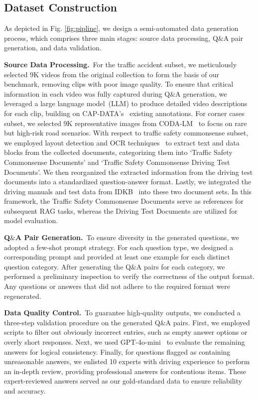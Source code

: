 \documentclass[sigconf]{acmart}
\begin{document}
\subsection{Dataset Construction}

As depicted in Fig. \ref{fig:pipline}, we design a semi-automated data generation process, which comprises three main stages: source data processing, Q$\&$A pair generation, and data validation.

\noindent\textbf{Source Data Processing.}~For the traffic accident subset, we meticulously selected 9K videos from the original collection to form the basis of our benchmark, removing clips with poor image quality. To ensure that critical information in each video was fully captured during Q$\&$A generation, we leveraged a large language model~(LLM) to produce detailed video descriptions for each clip, building on CAP-DATA’s~\cite{fang2022cognitive} existing annotations. For corner cases subset, we selected 9K representative images from CODA-LM~\cite{chen2024automated} to focus on rare but high-risk road scenarios. With respect to traffic safety commonsense subset, we employed layout detection and OCR techniques~\cite{li2022ppocrv3} to extract text and data blocks from the collected documents, categorizing them into `Traffic Safety Commonsense Documents' and `Traffic Safety Commonsense Driving Test Documents'. We then reorganized the extracted information from the driving test documents into a standardized question-answer format. Lastly, we integrated the driving manuals and test data from IDKB~\cite{lu2024lvlms} into these two document sets. In this framework, the Traffic Safety Commonsense Documents serve as references for subsequent RAG tasks, whereas the Driving Test Documents are utilized for model evaluation.

\noindent\textbf{Q$\&$A Pair Generation.}~To ensure diversity in the generated questions, we adopted a few-shot prompt strategy. For each question type, we designed a corresponding prompt and provided at least one example for each distinct question category. After generating the Q$\&$A pairs for each category, we performed a preliminary inspection to verify the correctness of the output format. Any questions or answers that did not adhere to the required format were regenerated. 

\noindent\textbf{Data Quality Control.}~To guarantee high-quality outputs, we conducted a three-step validation procedure on the generated Q$\&$A pairs. First, we employed scripts to filter out obviously incorrect entries, such as empty answer options or overly short responses. Next, we used GPT-4o-mini~\cite{openai2024gpt4} to evaluate the remaining answers for logical consistency. Finally, for questions flagged as containing unreasonable answers, we enlisted 10 experts with driving experience to perform an in-depth review, providing professional answers for contentious items. These expert-reviewed answers served as our gold-standard data to ensure reliability and accuracy.
\end{document}
